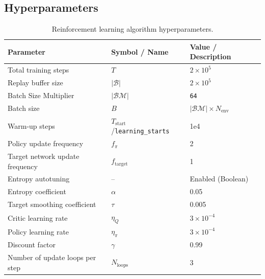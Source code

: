 \documentclass{article}
\begin{document}
\subsection{Hyperparameters}
\begin{table}[htbp]
\centering
\caption{Reinforcement learning algorithm hyperparameters.}
\label{tab:rl_hyperparameters}
\begin{tabular}{lll}
\hline
\textbf{Parameter} & \textbf{Symbol / Name} & \textbf{Value / Description} \\
\hline
Total training steps &
$T$ &
$2 \times 10^{5}$\\

Replay buffer size &
$|\mathcal{B}|$ &
$2 \times 10^{5}$ \\
Batch Size Multiplier &
$|\mathcal{BM}|$ &
\texttt{64} \\

Batch size &
$B$ &
$|\mathcal{BM}| \times N_{\text{env}}$ \\

Warm-up steps &
$T_{\text{start}}$/\texttt{learning\_starts} &
1e4 \\

Policy update frequency &
$f_{\pi}$ &
2 \\

Target network update frequency &
$f_{\text{target}}$ &
1 \\

Entropy autotuning &
-- &
Enabled (Boolean) \\

Entropy coefficient &
$\alpha$ &
0.05 \\
Target smoothing coefficient &
$\tau$ &
0.005 \\
Critic learning rate &
$\eta_Q$ &
$3 \times 10^{-4}$ \\
Policy learning rate &
$\eta_\pi$ &
$3 \times 10^{-4}$ \\
Discount factor &
$\gamma$ &
0.99 \\
Number of update loops per step &
$N_{\text{loops}}$ &
3 \\
\hline
\end{tabular}
\end{table}

\newpage
\end{document}
